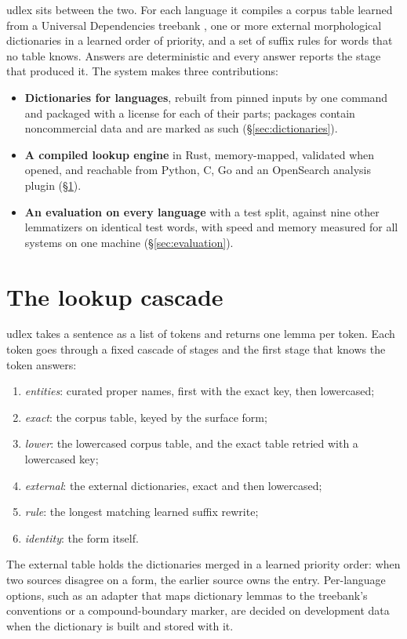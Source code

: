 \documentclass[11pt]{article}
\begin{document}
udlex sits between the two. For each language it compiles a corpus table
learned from a Universal Dependencies treebank \citep{nivre-etal-2020-universal,ud219},
one or more external morphological dictionaries in a learned order of
priority, and a set of suffix rules for words that no table knows. Answers
are deterministic and every answer reports the stage that produced it. The
system makes three contributions:
\begin{itemize}
\item \textbf{Dictionaries for \relLangs{} languages}, rebuilt from pinned
inputs by one command and packaged with a license for each of their parts;
\relNoncommercial{} packages contain noncommercial data and are marked as
such (\S\ref{sec:dictionaries}).
\item \textbf{A compiled lookup engine} in Rust, memory-mapped, validated
when opened, and reachable from Python, C, Go and an OpenSearch analysis
plugin (\S\ref{sec:engine}).
\item \textbf{An evaluation on every language} with a test split, against
nine other lemmatizers on identical test words, with speed and memory
measured for all systems on one machine (\S\ref{sec:evaluation}).
\end{itemize}

\section{The lookup cascade}
\label{sec:engine}

udlex takes a sentence as a list of tokens and returns one lemma per token.
Each token goes through a fixed cascade of stages and the first stage that
knows the token answers:
\begin{enumerate}
\item \emph{entities}: curated proper names, first with the exact key, then
lowercased;
\item \emph{exact}: the corpus table, keyed by the surface form;
\item \emph{lower}: the lowercased corpus table, and the exact table retried
with a lowercased key;
\item \emph{external}: the external dictionaries, exact and then lowercased;
\item \emph{rule}: the longest matching learned suffix rewrite;
\item \emph{identity}: the form itself.
\end{enumerate}
The external table holds the dictionaries merged in a learned priority
order: when two sources disagree on a form, the earlier source owns the
entry. Per-language options, such as an adapter that maps dictionary lemmas to the
treebank's conventions or a compound-boundary marker, are decided on
development data when the dictionary is built and stored with it.
\end{document}

